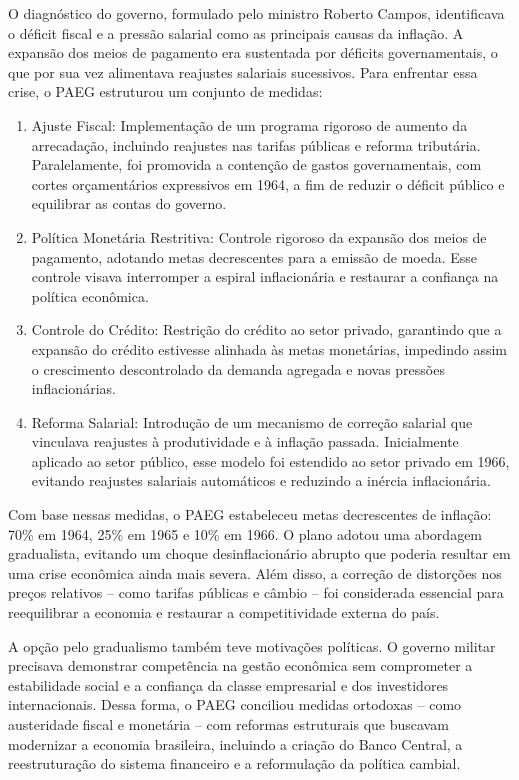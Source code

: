 \documentclass[a4paper,12pt]{article}[abntex2]
\begin{document}
O diagnóstico do governo, formulado pelo ministro Roberto Campos, identificava o déficit fiscal e a pressão salarial como as principais causas da inflação. A expansão dos meios de pagamento era sustentada por déficits governamentais, o que por sua vez alimentava reajustes salariais sucessivos. Para enfrentar essa crise, o PAEG estruturou um conjunto de medidas:\begin{enumerate}
    \item Ajuste Fiscal: Implementação de um programa rigoroso de aumento da arrecadação, incluindo reajustes nas tarifas públicas e reforma tributária. Paralelamente, foi promovida a contenção de gastos governamentais, com cortes orçamentários expressivos em 1964, a fim de reduzir o déficit público e equilibrar as contas do governo.
    \item Política Monetária Restritiva: Controle rigoroso da expansão dos meios de pagamento, adotando metas decrescentes para a emissão de moeda. Esse controle visava interromper a espiral inflacionária e restaurar a confiança na política econômica.
    \item Controle do Crédito: Restrição do crédito ao setor privado, garantindo que a expansão do crédito estivesse alinhada às metas monetárias, impedindo assim o crescimento descontrolado da demanda agregada e novas pressões inflacionárias.
    \item Reforma Salarial: Introdução de um mecanismo de correção salarial que vinculava reajustes à produtividade e à inflação passada. Inicialmente aplicado ao setor público, esse modelo foi estendido ao setor privado em 1966, evitando reajustes salariais automáticos e reduzindo a inércia inflacionária.
\end{enumerate}

Com base nessas medidas, o PAEG estabeleceu metas decrescentes de inflação: 70\% em 1964, 25\% em 1965 e 10\% em 1966. O plano adotou uma abordagem gradualista, evitando um choque desinflacionário abrupto que poderia resultar em uma crise econômica ainda mais severa. Além disso, a correção de distorções nos preços relativos – como tarifas públicas e câmbio – foi considerada essencial para reequilibrar a economia e restaurar a competitividade externa do país.

A opção pelo gradualismo também teve motivações políticas. O governo militar precisava demonstrar competência na gestão econômica sem comprometer a estabilidade social e a confiança da classe empresarial e dos investidores internacionais. Dessa forma, o PAEG conciliou medidas ortodoxas – como austeridade fiscal e monetária – com reformas estruturais que buscavam modernizar a economia brasileira, incluindo a criação do Banco Central, a reestruturação do sistema financeiro e a reformulação da política cambial.
\end{document}
